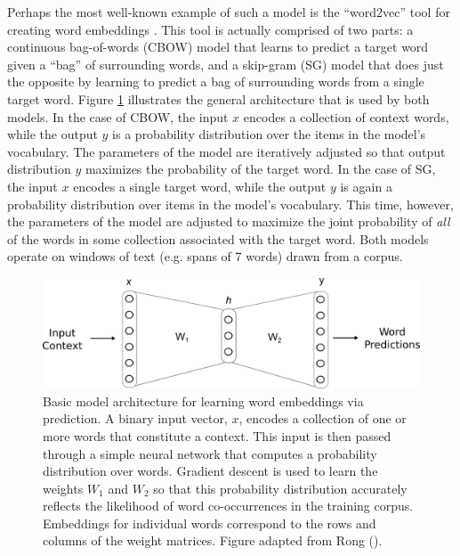 Perhaps the most well-known example of such a model is the ``word2vec'' tool for creating word embeddings \citep{Mikolov:2013}. This tool is actually comprised of two parts: a continuous bag-of-words (CBOW) model that learns to predict a target word given a ``bag'' of surrounding words, and a skip-gram (SG) model that does just the opposite by learning to predict a bag of surrounding words from a single target word. Figure \ref{fig:w2v} illustrates the general architecture that is used by both models. In the case of CBOW, the input $x$ encodes a collection of context words, while the output $y$ is a probability distribution over the items in the model's vocabulary. The parameters of the model are iteratively adjusted so that output distribution $y$ maximizes the probability of the target word. In the case of SG, the input $x$ encodes a single target word, while the output $y$ is again a probability distribution over items in the model's vocabulary. This time, however, the parameters of the model are adjusted to maximize the joint probability of \textit{all} of the words in some collection associated with the target word. Both models operate on windows of text (e.g. spans of 7 words) drawn from a corpus.  

\begin{figure}
\centering
	\includegraphics[width=4.5in]{figures/word2vec.png}
	\caption{Basic model architecture for learning word embeddings via prediction. A binary input vector, $x$, encodes a collection of one or more words that constitute a context. This input is then passed through a simple neural network that computes a probability distribution over words. Gradient descent is used to learn the weights $W_1$ and $W_2$ so that this probability distribution accurately reflects the likelihood of word co-occurrences in the training corpus. Embeddings for individual words correspond to the rows and columns of the weight matrices. Figure adapted from Rong (\citeyear{Rong:2014}).}
    \label{fig:w2v}
\end{figure}

